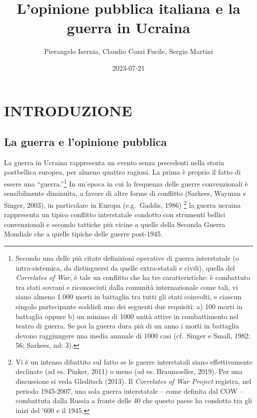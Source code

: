 \documentclass[
]{book}
\title{L'opinione pubblica italiana e la guerra in Ucraina}
\author{Pierangelo Isernia, Claudio Cozzi Fucile, Sergio Martini}
\date{2023-07-21}
\begin{document}
\maketitle

{
\setcounter{tocdepth}{1}
\tableofcontents
}
\hypertarget{introduzione}{%
\chapter{INTRODUZIONE}\label{introduzione}}

\hypertarget{la-guerra-e-lopinione-pubblica}{%
\section{La guerra e l'opinione pubblica}\label{la-guerra-e-lopinione-pubblica}}

La guerra in Ucraina rappresenta un evento senza precedenti nella storia postbellica europea, per almeno quattro ragioni. La prima è proprio il fatto di essere una ``guerra.''\footnote{Secondo una delle più citate definizioni operative di guerra interstatale (o intra-sistemica, da distinguersi da quelle extra-statali e civili), quella del \emph{Correlates of War}, è tale un conflitto che ha tre caratteristiche: è combattuto tra stati sovrani e riconosciuti dalla comunità internazionale come tali, vi siano almeno 1.000 morti in battaglia tra tutti gli stati coinvolti, e ciascun singolo partecipante soddisfi uno dei seguenti due requisiti: a) 100 morti in battaglia oppure b) un minimo di 1000 unità attive in combattimento nel teatro di guerra. Se poi la guerra dura più di un anno i morti in battaglia devono raggiungere una media annuale di 1000 casi (cf.~Singer e Small, 1982: 56; Sarkees, nd: 3).} In un'epoca in cui la frequenza delle guerre convenzionali è sensibilmente diminuita, a favore di altre forme di conflitto (Sarkees, Wayman e Singer, 2003), in particolare in Europa (e.g.~Gaddis, 1986) \footnote{Vi è un intenso dibattito sul fatto se le guerre interstatali siano effettivamente declinate (ad es. Pinker, 2011) o meno (ad es. Braumoeller, 2019). Per una discussione si veda Gleditsch (2013). Il \emph{Correlates of War Project} registra, nel periodo 1945-2007, una sola guerra interstatale -- come definita dal COW -- combattuta dalla Russia a fronte delle 40 che questo paese ha condotto tra gli inizi del '600 e il 1945.} la guerra ucraina rappresenta un tipico conflitto interstatale condotto con strumenti bellici convenzionali e secondo tattiche più vicine a quelle della Seconda Guerra Mondiale che a quelle tipiche delle guerre post-1945.
\end{document}
